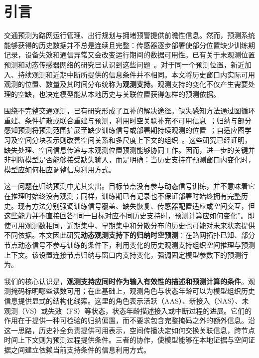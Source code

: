 \section{引言}\label{sec:intro}
交通预测为路网运行管理、出行规划与拥堵预警提供前瞻性信息。然而，预测系统能够获得的历史数据并不总是连续且完整：传感器逐步部署使部分位置缺少训练期记录，设备失效和通信异常又会改变运行期间的数据可用性。已有关于未观测位置预测和动态传感器网络的研究已认识到这些问题~\citep{mei2023uncertainty,zhou2025mogernn,zhao2026structure}。对于同一个预测位置，新近加入、持续观测和近期中断所提供的信息条件并不相同。本文将历史窗口内实际可用观测的位置、数量及其时间分布统称为\textbf{观测支持}。观测支持的变化不仅产生需要处理的空缺，也决定模型能从本地历史与关联位置获得怎样的预测依据。

围绕不完整交通观测，已有研究形成了互补的解决途径。缺失感知方法通过图循环重建、条件扩散或联合重建与预测，利用时空关联补充不可用信息~\citep{cini2022filling,liu2023pristi,zuo2023graph,yu2024ginar}；归纳与部分感知预测将预测范围扩展至缺少训练信号或部署期持续观测的位置~\citep{mei2023uncertainty,zhou2025mogernn,liu2025spatiotemporal,zhao2026structure}；自适应图学习及空间分块表示则改善空间关系和多尺度上下文的组织~\citep{yu2018spatio,wu2019graph,bai2020adaptive,jiang2023pdformer,fang2025efficient}。这些研究已经证明，缺失处理、空间信息传递与未观测位置预测能够协同工作。因而，进一步的关键并非判断模型是否能够接受缺失输入，而是明确：当历史支持在预测窗口内变化时，模型应如何相应调整信息利用方式。

这一问题在归纳预测中尤其突出。目标节点没有参与动态信号训练，并不意味着它在推理时始终没有观测；同样，训练期已有记录也不保证部署时始终拥有完整历史。现有方法分别强调训练信号覆盖、缺失恢复、传感器配置适应或空间交互，但这些能力并不直接回答“同一目标对应不同历史支持时，预测计算应如何变化”。即使可用观测数相同，近期集中、早期集中和分散分布的历史也可能对未来状态提供不同依据。本文因此研究\textbf{动态观测支持下的归纳时空预测}：在路网拓扑已知、部分节点动态信号不参与训练的条件下，利用变化的历史观测支持组织空间推理与预测上下文。该设置连接节点归纳与窗口内支持变化，强调固定模型参数下的预测行为。

我们的核心认识是，\textbf{观测支持应同时作为输入有效性的描述和预测计算的条件}。观测掩码标明哪些读数可用；在此基础上，观测角色与状态年龄可以为模型组织历史信息提供显式的结构化线索。这里的角色表示活跃（AAS）、新接入（NAS）、未观测（VS）或失效（FS）等状态，状态年龄描述接入或中断过程的进展。它们的作用在于提供一种可检验的归纳偏置，而不要求包含完整掩码之外的额外信息。沿这一思路，历史补全负责提供可用表示，空间传播决定如何交换关联信息，跨节点时间上下文则为预测过程提供条件。三者的协作，使模型能够在本地证据与空间证据之间建立依赖当前支持条件的信息利用方式。

